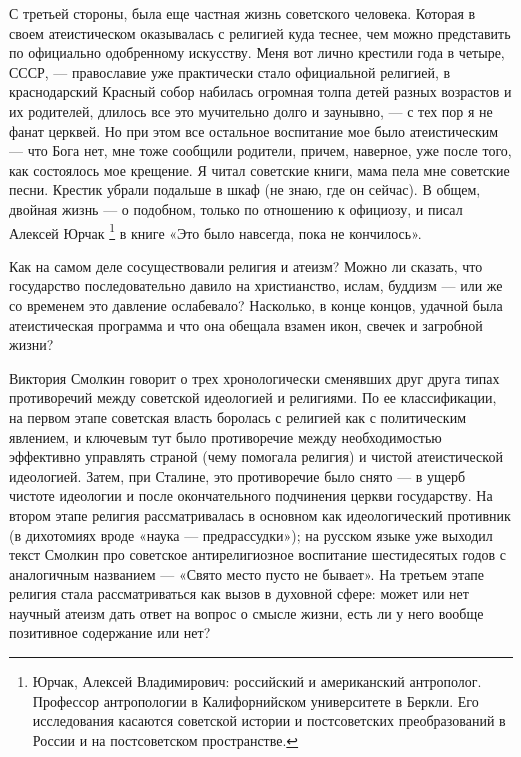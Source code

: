 С третьей стороны, была еще частная жизнь советского человека.
Которая в своем атеистическом
 оказывалась
 с религией куда теснее,
чем можно представить по официально одобренному искусству.
Меня вот лично крестили года в четыре,
 СССР,
--- православие уже практически стало официальной религией,
в краснодарский Красный собор набилась огромная толпа детей разных
возрастов и их родителей, длилось все это мучительно долго и заунывно,
--- с тех пор я не фанат церквей.
Но при этом все остальное воспитание мое было атеистическим ---
что Бога нет, мне тоже сообщили родители, причем, наверное,
уже после того, как состоялось мое крещение.
Я читал советские книги, мама пела мне советские песни.
Крестик убрали подальше в шкаф (не знаю, где он сейчас).
В общем, двойная жизнь --- о подобном, только по отношению к официозу,
и писал Алексей Юрчак%
\footnote{Юрчак, Алексей Владимирович: российский и американский антрополог.
    Профессор антропологии в Калифорнийском университете в Беркли.
    Его исследования касаются советской истории и постсоветских преобразований
    в России и на постсоветском пространстве. }
в книге «Это было навсегда, пока не кончилось».

Как на самом деле сосуществовали религия и атеизм?
Можно ли сказать, что государство последовательно давило на христианство,
ислам, буддизм --- или же со временем это давление ослабевало?
Насколько, в конце концов, удачной была атеистическая программа
и что она обещала взамен икон, свечек и загробной жизни?

Виктория Смолкин говорит о трех хронологически сменявших друг друга типах
противоречий между советской идеологией и религиями.
По ее классификации, на первом этапе советская власть боролась с религией как
с политическим явлением, и ключевым тут было противоречие между необходимостью
эффективно управлять страной (чему помогала религия) и чистой атеистической идеологией.
Затем, при Сталине, это противоречие было снято --- в ущерб чистоте идеологии
и после окончательного подчинения церкви государству.
На втором этапе религия рассматривалась в основном как идеологический противник
(в дихотомиях вроде «наука --- предрассудки»);
на русском языке уже выходил текст Смолкин про советское антирелигиозное
воспитание шестидесятых годов с аналогичным названием ---
«Свято место пусто не бывает».
На третьем этапе религия стала рассматриваться как вызов в духовной сфере:
может или нет научный атеизм дать ответ на вопрос о смысле жизни,
есть ли у него вообще позитивное содержание или нет?

